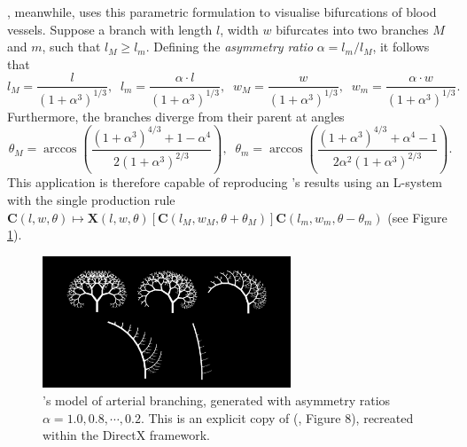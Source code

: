 \documentclass[a4paper, 11pt]{article}
\begin{document}
\begin{flushleft}
\vspace{5pt}\noindent
\citet{zamirArterialBranchingLSystems}, meanwhile, uses this parametric formulation to visualise bifurcations of blood vessels. Suppose a branch with length $l$, width $w$ bifurcates into two branches $M$ and $m$, such that $l_M \geq l_m$. Defining the \textit{asymmetry ratio} $\alpha = l_m/l_M$, it follows that
$$l_M = \frac{l}{\left(1+\alpha^3\right)^{1/3}}, \;\; l_m = \frac{\alpha\cdot l}{\left(1+\alpha^3\right)^{1/3}}, \;\; w_M = \frac{w}{\left(1+\alpha^3\right)^{1/3}}, \;\; w_m = \frac{\alpha\cdot w}{\left(1+\alpha^3\right)^{1/3}}.$$
Furthermore, the branches diverge from their parent at angles
$$\theta_M = \arccos\left(\frac{\left(1+\alpha^3\right)^{4/3}+1-\alpha^4}{2\left(1+\alpha^3\right)^{2/3}}\right), \;\; \theta_m = \arccos\left(\frac{\left(1+\alpha^3\right)^{4/3}+\alpha^4-1}{2\alpha^2\left(1+\alpha^3\right)^{2/3}}\right).$$
This application is therefore capable of reproducing \citeauthor{zamirArterialBranchingLSystems}'s results using an L-system with the single production rule $\mathbf{C}(l,w,\theta) \mapsto \mathbf{X}(l,w,\theta)[\mathbf{C}(l_M,w_M,\theta+\theta_M)]\mathbf{C}(l_m,w_m,\theta-\theta_m)$ (see Figure \ref{Zamir's Model}).

\vspace{5pt}\noindent
\begin{figure}[h]
\centering
\includegraphics[width=0.66\textwidth]{Zamir's Model}
\caption{\citeauthor{zamirArterialBranchingLSystems}'s model of arterial branching, generated with asymmetry ratios $\alpha = 1.0, 0.8, \cdots, 0.2$. This is an explicit copy of \citeauthor{zamirArterialBranchingLSystems} (\citeyear{zamirArterialBranchingLSystems}, Figure 8), recreated within the DirectX framework.}
\label{Zamir's Model}
\end{figure}



\end{flushleft}
\end{document}
